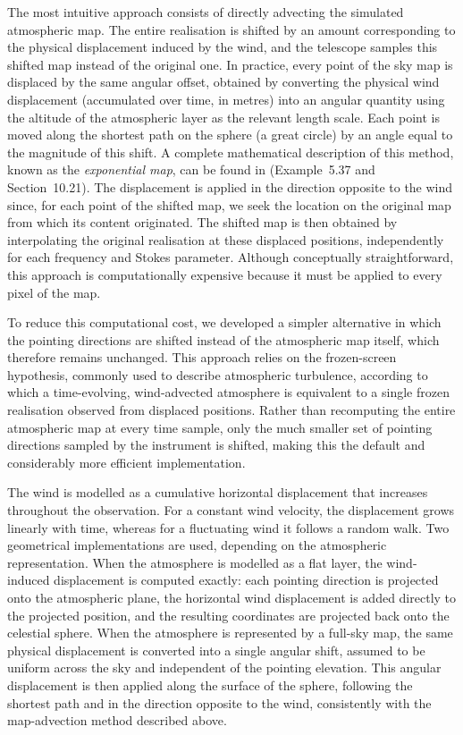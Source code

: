 \documentclass[../../thesis.tex]{subfiles}
\begin{document}
The most intuitive approach consists of directly advecting the simulated atmospheric map. The entire realisation is shifted by an amount corresponding to the physical displacement induced by the wind, and the telescope samples this shifted map instead of the original one. In practice, every point of the sky map is displaced by the same angular offset, obtained by converting the physical wind displacement (accumulated over time, in metres) into an angular quantity using the altitude of the atmospheric layer as the relevant length scale. Each point is moved along the shortest path on the sphere (a great circle) by an angle equal to the magnitude of this shift. A complete mathematical description of this method, known as the \emph{exponential map}, can be found in \cite{boumal2023} (Example~5.37 and Section~10.21). The displacement is applied in the direction opposite to the wind since, for each point of the shifted map, we seek the location on the original map from which its content originated. The shifted map is then obtained by interpolating the original realisation at these displaced positions, independently for each frequency and Stokes parameter. Although conceptually straightforward, this approach is computationally expensive because it must be applied to every pixel of the map.

To reduce this computational cost, we developed a simpler alternative in which the pointing directions are shifted instead of the atmospheric map itself, which therefore remains unchanged. This approach relies on the frozen-screen hypothesis, commonly used to describe atmospheric turbulence, according to which a time-evolving, wind-advected atmosphere is equivalent to a single frozen realisation observed from displaced positions. Rather than recomputing the entire atmospheric map at every time sample, only the much smaller set of pointing directions sampled by the instrument is shifted, making this the default and considerably more efficient implementation.

The wind is modelled as a cumulative horizontal displacement that increases throughout the observation. For a constant wind velocity, the displacement grows linearly with time, whereas for a fluctuating wind it follows a random walk. Two geometrical implementations are used, depending on the atmospheric representation. When the atmosphere is modelled as a flat layer, the wind-induced displacement is computed exactly: each pointing direction is projected onto the atmospheric plane, the horizontal wind displacement is added directly to the projected position, and the resulting coordinates are projected back onto the celestial sphere. When the atmosphere is represented by a full-sky map, the same physical displacement is converted into a single angular shift, assumed to be uniform across the sky and independent of the pointing elevation. This angular displacement is then applied along the surface of the sphere, following the shortest path and in the direction opposite to the wind, consistently with the map-advection method described above.
\end{document}

